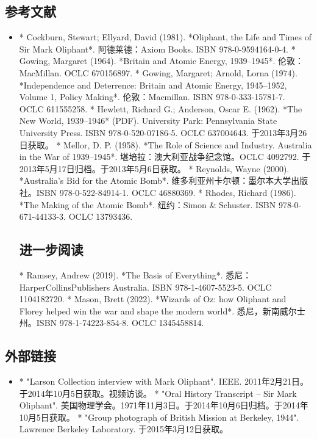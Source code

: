 \subsection{参考文献}
\begin{itemize}
\item * Cockburn, Stewart; Ellyard, David (1981). *Oliphant, the Life and Times of Sir Mark Oliphant*. 阿德莱德：Axiom Books. ISBN 978-0-9594164-0-4.
* Gowing, Margaret (1964). *Britain and Atomic Energy, 1939–1945*. 伦敦：MacMillan. OCLC 670156897.
* Gowing, Margaret; Arnold, Lorna (1974). *Independence and Deterrence: Britain and Atomic Energy, 1945–1952, Volume 1, Policy Making*. 伦敦：Macmillan. ISBN 978-0-333-15781-7. OCLC 611555258.
* Hewlett, Richard G.; Anderson, Oscar E. (1962). *The New World, 1939–1946* (PDF). University Park: Pennsylvania State University Press. ISBN 978-0-520-07186-5. OCLC 637004643. 于2013年3月26日获取。
* Mellor, D. P. (1958). *The Role of Science and Industry. Australia in the War of 1939–1945*. 堪培拉：澳大利亚战争纪念馆。OCLC 4092792. 于2013年5月17日归档。于2013年5月6日获取。
* Reynolds, Wayne (2000). *Australia's Bid for the Atomic Bomb*. 维多利亚州卡尔顿：墨尔本大学出版社。ISBN 978-0-522-84914-1. OCLC 46880369.
* Rhodes, Richard (1986). *The Making of the Atomic Bomb*. 纽约：Simon & Schuster. ISBN 978-0-671-44133-3. OCLC 13793436.

\subsection{进一步阅读}

* Ramsey, Andrew (2019). *The Basis of Everything*. 悉尼：HarperCollinsPublishers Australia. ISBN 978-1-4607-5523-5. OCLC 1104182720.
* Mason, Brett (2022). *Wizards of Oz: how Oliphant and Florey helped win the war and shape the modern world*. 悉尼，新南威尔士州。ISBN 978-1-74223-854-8. OCLC 1345458814.
\end{itemize}

\subsection{外部链接}

\begin{itemize}
\item * "Larson Collection interview with Mark Oliphant". IEEE. 2011年2月21日。于2014年10月5日获取。视频访谈。
* "Oral History Transcript – Sir Mark Oliphant". 美国物理学会。1971年11月3日。于2014年10月6日归档。于2014年10月5日获取。
* "Group photograph of British Mission at Berkeley, 1944". Lawrence Berkeley Laboratory. 于2015年3月12日获取。
\end{itemize}
